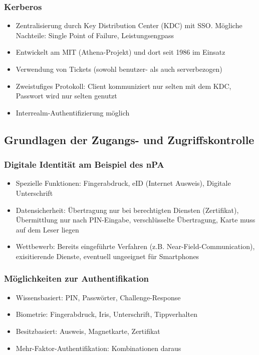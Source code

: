 \subsubsection{Kerberos}
\begin{itemize}
	\item Zentralisierung durch Key Distribution Center (KDC) mit SSO. Mögliche Nachteile: Single Point of Failure, Leistungsengpass
	\item Entwickelt am MIT (Athena-Projekt) und dort seit 1986 im Einsatz
	\item Verwendung von Tickets (sowohl benutzer- als auch serverbezogen)
	\item Zweistufiges Protokoll: Client kommuniziert nur selten mit dem KDC, Passwort wird nur selten genutzt
	\item Interrealm-Authentifizierung möglich
\end{itemize}


\subsection{Grundlagen der Zugangs- und Zugriffskontrolle}

\subsubsection{Digitale Identität am Beispiel des nPA}
\begin{itemize}
	\item Spezielle Funktionen: Fingerabdruck, eID (Internet Ausweis), Digitale Unterschrift
	\item Datensicherheit: Übertragung nur bei berechtigten Diensten (Zertifikat), Übermittlung nur nach PIN-Eingabe, verschlüsselte Übertragung, Karte muss auf dem Leser liegen
	\item Wettbewerb: Bereits eingeführte Verfahren (z.B. Near-Field-Communication), exisitierende Dienste, eventuell ungeeignet für Smartphones
\end{itemize}

\subsubsection{Möglichkeiten zur Authentifikation}
\begin{itemize}
	\item Wissensbasiert: PIN, Passwörter, Challenge-Response
	\item Biometrie: Fingerabdruck, Iris, Unterschrift, Tippverhalten
	\item Besitzbasiert: Ausweis, Magnetkarte, Zertifikat
	\item Mehr-Faktor-Authentifikation: Kombinationen daraus
\end{itemize}


